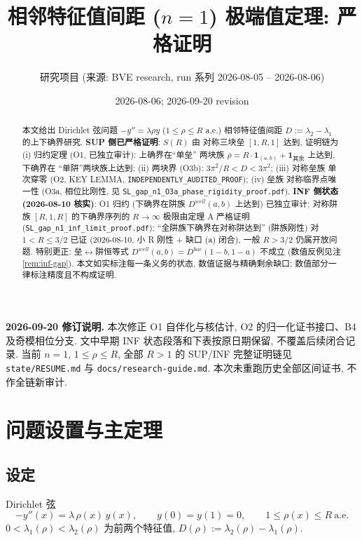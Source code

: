 \documentclass[UTF8]{ctexart}
\title{相邻特征值间距 ($n=1$) 极端值定理: 严格证明}
\author{研究项目 (来源: BVE research, run 系列 2026-08-05 -- 2026-08-06)}
\date{2026-08-06; 2026-09-20 revision}
\begin{document}
\maketitle

\begin{abstract}
本文给出 Dirichlet 弦问题 $-y''=\lambda\rho y$ ($1\le\rho\le R$ a.e.) 相邻特征值间距
$D:=\lambda_2-\lambda_1$ 的上下确界研究. \textbf{SUP 侧已严格证明}: $S(R)$ 由
对称三块垒 $[1,R,1]$ 达到, 证明链为 (i) 归约定理 (O1, 已独立审计): 上确界在``单垒''
两块族 $\rho=R\cdot\mathbf 1_{(a,b)}+\mathbf 1_{\text{其余}}$ 上达到, 下确界在
``单阱''两块族上达到; (ii) 两块界 (O3b): $3\pi^2/R<D<3\pi^2$; (iii) 对称垒族
单次穿零 (O2, KEY LEMMA, \texttt{INDEPENDENTLY\_AUDITED\_PROOF}); (iv) 垒族
对称临界点唯一性 (O3a, 相位比刚性, 见 \texttt{SL\_gap\_n1\_O3a\_phase\_rigidity\_proof.pdf}).
\textbf{INF 侧状态 (2026-08-10 核实)}: O1 归约 (下确界在阱族 $D^{well}(a,b)$ 上达到)
已独立审计; 对称阱族 $[R,1,R]$ 的下确界序列的 $R\to\infty$ 极限由定理 A 严格证明
(\texttt{SL\_gap\_n1\_inf\_limit\_proof.pdf}); ``全阱族下确界在对称阱达到'' (阱族刚性) 对 $1<R\le3/2$ 已证 (2026-08-10, 小 R 刚性 + 缺口 (a) 闭合), 一般 $R>3/2$ 仍属开放问题. 特别更正: 垒$\leftrightarrow$阱恒等式
$D^{well}(a,b)=D^{bar}(1-b,1-a)$ 不成立 (数值反例见注 \ref{rem:inf-gap}).
本文如实标注每一条义务的状态, 数值证据与精确剩余缺口; 数值部分一律标注精度且不构成证明.
\end{abstract}

\noindent\textbf{2026-09-20 修订说明.}
本次修正 O1 自伴化与核估计, O2 的归一化证书接口、B4 及奇模相位分支.
文中早期 INF 状态段落和下表按原日期保留, 不覆盖后续闭合记录.
当前 $n=1$, $1\le\rho\le R$, 全部 $R>1$ 的 SUP/INF 完整证明链见
\texttt{state/RESUME.md} 与 \texttt{docs/research-guide.md}.
本次未重跑历史全部区间证书, 不作全链新审计.

\tableofcontents

\section{问题设置与主定理}

\subsection{设定}
Dirichlet 弦
\begin{equation}
	-y''(x) = \lambda\,\rho(x)\,y(x),\qquad y(0)=y(1)=0,\qquad
	1\le\rho(x)\le R\ \text{a.e.}
\end{equation}
$0<\lambda_1(\rho)<\lambda_2(\rho)$ 为前两个特征值, $D(\rho):=\lambda_2(\rho)-\lambda_1(\rho)$.
\end{document}
